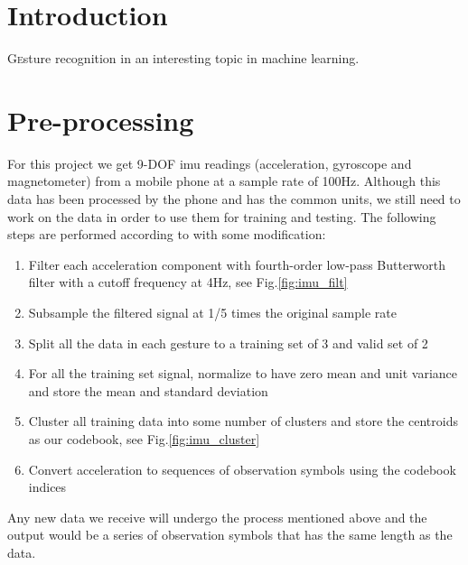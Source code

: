 \documentclass[twoside]{article}
\begin{document}
\begin{multicols}{2} %

\section{Introduction}
\lettrine[nindent=0em,lines=2]{G}esture recognition in an interesting topic in machine learning.


\section{Pre-processing}

For this project we get 9-DOF imu readings (acceleration, gyroscope and magnetometer) from a mobile phone at a sample rate of 100Hz. Although this data has been processed by the phone and has the common units, we still need to work on the data in order to use them for training and testing. The following steps are performed according to \cite{Vesa00} with some modification:

\begin{enumerate}
	\item Filter each acceleration component with fourth-order low-pass Butterworth filter with a cutoff frequency at 4Hz, see Fig.\ref{fig:imu_filt}
	\item Subsample the filtered signal at 1/5 times the original sample rate
	\item Split all the data in each gesture to a training set of 3 and valid set of 2
	\item For all the training set signal, normalize to have zero mean and unit variance and store the mean and standard deviation
	\item Cluster all training data into some number of clusters and store the centroids as our codebook, see Fig.\ref{fig:imu_cluster}
	\item Convert acceleration to sequences of observation symbols using the codebook indices
\end{enumerate}

Any new data we receive will undergo the process mentioned above and the output would be a series of observation symbols that has the same length as the data.


\end{multicols}
\end{document}
